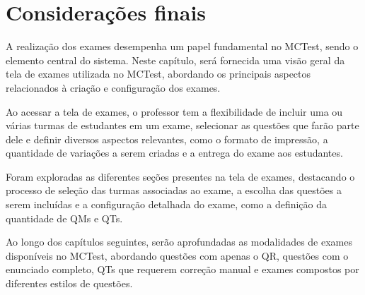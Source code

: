 
\section{Considerações finais}

A realização dos exames desempenha um papel fundamental no MCTest, sendo o elemento central do sistema. Neste capítulo, será fornecida uma visão geral da tela de exames utilizada no MCTest, abordando os principais aspectos relacionados à criação e configuração dos exames.

Ao acessar a tela de exames, o professor tem a flexibilidade de incluir uma ou várias turmas de estudantes em um exame, selecionar as questões que farão parte dele e definir diversos aspectos relevantes, como o formato de impressão, a quantidade de variações a serem criadas e a entrega do exame aos estudantes.

Foram exploradas as diferentes seções presentes na tela de exames, destacando o processo de seleção das turmas associadas ao exame, a escolha das questões a serem incluídas e a configuração detalhada do exame, como a definição da quantidade de QMs e QTs.

Ao longo dos capítulos seguintes, serão aprofundadas as modalidades de exames disponíveis no MCTest, abordando questões com apenas o QR, questões com o enunciado completo, QTs que requerem correção manual e exames compostos por diferentes estilos de questões.

